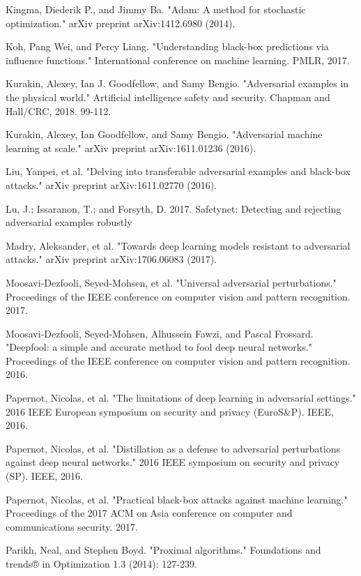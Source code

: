 \begin{thebibliography}{9}
	\bibitem{}
	Kingma, Diederik P., and Jimmy Ba. "Adam: A method for stochastic optimization." arXiv preprint arXiv:1412.6980 (2014).
	
	\bibitem{}
	Koh, Pang Wei, and Percy Liang. "Understanding black-box predictions via influence functions." International conference on machine learning. PMLR, 2017.
	
	\bibitem{}
	Kurakin, Alexey, Ian J. Goodfellow, and Samy Bengio. "Adversarial examples in the physical world." Artificial intelligence safety and security. Chapman and Hall/CRC, 2018. 99-112.
	
	\bibitem{}
	Kurakin, Alexey, Ian Goodfellow, and Samy Bengio. "Adversarial machine learning at scale." arXiv preprint arXiv:1611.01236 (2016).
	
	\bibitem{}
	Liu, Yanpei, et al. "Delving into transferable adversarial examples and black-box attacks." arXiv preprint arXiv:1611.02770 (2016).
	
	\bibitem{}
	Lu, J.; Issaranon, T.; and Forsyth, D. 2017. Safetynet: Detecting and rejecting adversarial examples robustly
	
	\bibitem{}
	Madry, Aleksander, et al. "Towards deep learning models resistant to adversarial attacks." arXiv preprint arXiv:1706.06083 (2017).
	
	\bibitem{}
	Moosavi-Dezfooli, Seyed-Mohsen, et al. "Universal adversarial perturbations." Proceedings of the IEEE conference on computer vision and pattern recognition. 2017.
	
	\bibitem{}
	Moosavi-Dezfooli, Seyed-Mohsen, Alhussein Fawzi, and Pascal Frossard. "Deepfool: a simple and accurate method to fool deep neural networks." Proceedings of the IEEE conference on computer vision and pattern recognition. 2016.
	
	\bibitem{}
	Papernot, Nicolas, et al. "The limitations of deep learning in adversarial settings." 2016 IEEE European symposium on security and privacy (EuroS\&P). IEEE, 2016.
	
	\bibitem{}
	Papernot, Nicolas, et al. "Distillation as a defense to adversarial perturbations against deep neural networks." 2016 IEEE symposium on security and privacy (SP). IEEE, 2016.
	
	\bibitem{}
	Papernot, Nicolas, et al. "Practical black-box attacks against machine learning." Proceedings of the 2017 ACM on Asia conference on computer and communications security. 2017.
	
	\bibitem{}
	Parikh, Neal, and Stephen Boyd. "Proximal algorithms." Foundations and trends® in Optimization 1.3 (2014): 127-239.
	

\end{thebibliography}
